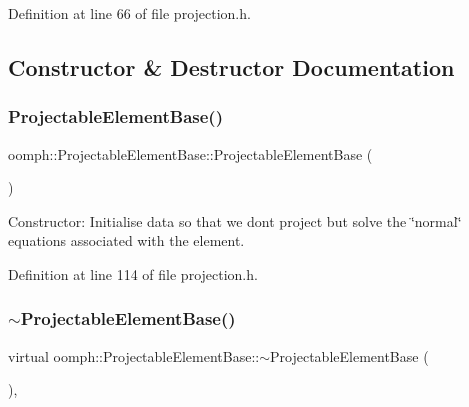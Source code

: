 Definition at line 66 of file projection.\+h.



\subsection{Constructor \& Destructor Documentation}
\mbox{\label{classoomph_1_1ProjectableElementBase_a7ee05f9195757b46b3693786cd260ac5}} 
\subsubsection{\texorpdfstring{Projectable\+Element\+Base()}{ProjectableElementBase()}}
{\footnotesize\ttfamily oomph\+::\+Projectable\+Element\+Base\+::\+Projectable\+Element\+Base (\begin{DoxyParamCaption}{ }\end{DoxyParamCaption})\hspace{0.3cm}{\ttfamily [inline]}}

Constructor\+: Initialise data so that we don\textquotesingle{}t project but solve the \char`\"{}normal\char`\"{} equations associated with the element. 

Definition at line 114 of file projection.\+h.

\mbox{\label{classoomph_1_1ProjectableElementBase_a668500db9bcaab7aa983d3c92f94e34b}} 
\subsubsection{\texorpdfstring{$\sim$\+Projectable\+Element\+Base()}{~ProjectableElementBase()}}
{\footnotesize\ttfamily virtual oomph\+::\+Projectable\+Element\+Base\+::$\sim$\+Projectable\+Element\+Base (\begin{DoxyParamCaption}{ }\end{DoxyParamCaption})\hspace{0.3cm}{\ttfamily [inline]}, {\ttfamily [virtual]}}



